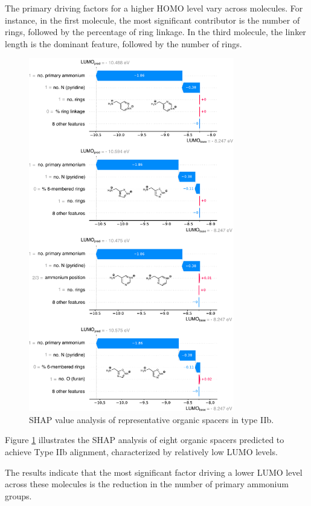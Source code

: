 The primary driving factors for a higher HOMO level vary across molecules. For instance, in the first molecule, the most significant contributor is the number of rings, followed by the percentage of ring linkage. In the third molecule, the linker length is the dominant feature, followed by the number of rings.
    
\begin{figure}[htbp]
    \centering
    \includegraphics[width=0.8\textwidth]{figures/HT-ML/figure4-19.pdf}
    \caption{SHAP value analysis of representative organic spacers in type IIb.}
    \label{fig:figure4.19}
\end{figure}

Figure \ref{fig:figure4.19} illustrates the SHAP analysis of eight organic spacers predicted to achieve Type IIb alignment, characterized by relatively low LUMO levels.

The results indicate that the most significant factor driving a lower LUMO level across these molecules is the reduction in the number of primary ammonium groups.

